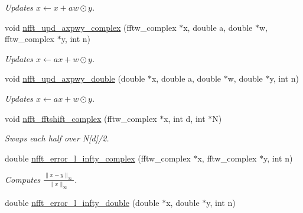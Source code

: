 \begin{CompactItemize}
\begin{CompactList}\small\item\em Updates $x \leftarrow x + a w\odot y$. \item\end{CompactList}\item 
\hypertarget{group__nfftutil_g693919963b51cf396311b15660e04cd8}{
void \hyperlink{group__nfftutil_g693919963b51cf396311b15660e04cd8}{nfft\_\-upd\_\-axpwy\_\-complex} (fftw\_\-complex $\ast$x, double a, double $\ast$w, fftw\_\-complex $\ast$y, int n)}
\label{group__nfftutil_g693919963b51cf396311b15660e04cd8}

\begin{CompactList}\small\item\em Updates $x \leftarrow a x + w\odot y$. \item\end{CompactList}\item 
\hypertarget{group__nfftutil_gf6777c4b8aa9f575f1600c51e8ae343a}{
void \hyperlink{group__nfftutil_gf6777c4b8aa9f575f1600c51e8ae343a}{nfft\_\-upd\_\-axpwy\_\-double} (double $\ast$x, double a, double $\ast$w, double $\ast$y, int n)}
\label{group__nfftutil_gf6777c4b8aa9f575f1600c51e8ae343a}

\begin{CompactList}\small\item\em Updates $x \leftarrow a x + w\odot y$. \item\end{CompactList}\item 
\hypertarget{group__nfftutil_ga388b5ec231e02ac45e37b60fd62e770}{
void \hyperlink{group__nfftutil_ga388b5ec231e02ac45e37b60fd62e770}{nfft\_\-fftshift\_\-complex} (fftw\_\-complex $\ast$x, int d, int $\ast$N)}
\label{group__nfftutil_ga388b5ec231e02ac45e37b60fd62e770}

\begin{CompactList}\small\item\em Swaps each half over N\mbox{[}d\mbox{]}/2. \item\end{CompactList}\item 
\hypertarget{group__nfftutil_g76b384a2f6c54e2686544e312f9ada5d}{
double \hyperlink{group__nfftutil_g76b384a2f6c54e2686544e312f9ada5d}{nfft\_\-error\_\-l\_\-infty\_\-complex} (fftw\_\-complex $\ast$x, fftw\_\-complex $\ast$y, int n)}
\label{group__nfftutil_g76b384a2f6c54e2686544e312f9ada5d}

\begin{CompactList}\small\item\em Computes $\frac{\|x-y\|_{\infty}}{\|x\|_{\infty}} $. \item\end{CompactList}\item 
\hypertarget{group__nfftutil_g49b9288690e3cf1990119c13e9137f09}{
double \hyperlink{group__nfftutil_g49b9288690e3cf1990119c13e9137f09}{nfft\_\-error\_\-l\_\-infty\_\-double} (double $\ast$x, double $\ast$y, int n)}
\label{group__nfftutil_g49b9288690e3cf1990119c13e9137f09}


\end{CompactItemize}
